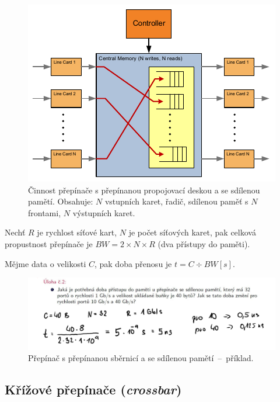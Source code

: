 \begin{figure}[H]
    \centering
    \includegraphics[width=1\linewidth]{prepinana_deska_sdilena_pamet.pdf}
    \caption{Činnost přepínače s přepínanou propojovací deskou a se sdílenou pamětí. Obsahuje: $N$ vstupních karet, řadič, sdílenou paměť s $N$ frontami, $N$ výstupních karet.}
\end{figure}

\begin{compactitem}
    \item Nechť $R$ je rychlost síťové kart, $N$ je počet síťových karet, pak celková propustnost přepínače je $BW = 2 \times N \times R$ (dva přístupy do paměti).
    \item Mějme data o velikosti $C$, pak doba přenosu je $t = C \div BW [s]$.
\end{compactitem}

\begin{figure}[H]
    \centering
    \includegraphics[width=1\linewidth]{prepinana_deska_sdilena_pamet_priklad.pdf}
    \caption{Přepínač s přepínanou sběrnicí a se sdílenou pamětí~--~příklad.}
\end{figure}

\subsection{Křížové přepínače (\textit{crossbar})}

